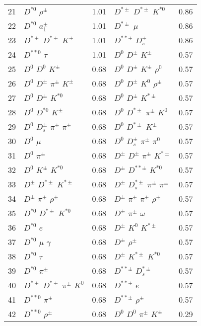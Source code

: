 \documentclass[6pt]{article}
\begin{document}
\begin{tabular}{rlr|lr}
21 & $D^{*0}$ $\rho^{\pm}$ & 1.01 & $D^{*\pm}$ $D^{*\pm}$ $K^{*0}$ & 0.86 \\
22 & $D^{*0}$ $a_1^{\pm}$ & 1.01 & $D^{*\pm}$ $\mu$ & 0.86 \\
23 & $D^{*\pm}$ $D^{*\pm}$ $K^{\pm}$ & 1.01 & $D^{**\pm}$ $D_s^{\pm}$ & 0.86 \\
24 & $D^{**0}$ $\tau$ & 1.01 & $D^0$ $D^{\pm}$ $K^{\pm}$ & 0.57 \\
25 & $D^0$ $D^0$ $K^{\pm}$ & 0.68 & $D^0$ $D^{\pm}$ $K^{\pm}$ $\rho^0$ & 0.57 \\
26 & $D^0$ $D^{\pm}$ $\pi^{\pm}$ $K^{\pm}$ & 0.68 & $D^0$ $D^{\pm}$ $K^0$ $\rho^{\pm}$ & 0.57 \\
27 & $D^0$ $D^{\pm}$ $K^{*0}$ & 0.68 & $D^0$ $D^{\pm}$ $K^{*\pm}$ & 0.57 \\
28 & $D^0$ $D^{*0}$ $K^{\pm}$ & 0.68 & $D^0$ $D^{*\pm}$ $\pi^{\pm}$ $K^0$ & 0.57 \\
29 & $D^0$ $D_s^{\pm}$ $\pi^{\pm}$ $\pi^{\pm}$ & 0.68 & $D^0$ $D^{*\pm}$ $K^{\pm}$ & 0.57 \\
30 & $D^0$ $\mu$ & 0.68 & $D^0$ $D_s^{\pm}$ $\pi^{\pm}$ $\pi^0$ & 0.57 \\
31 & $D^0$ $\pi^{\pm}$ & 0.68 & $D^{\pm}$ $D^{\pm}$ $\pi^{\pm}$ $K^{*\pm}$ & 0.57 \\
32 & $D^0$ $K^{\pm}$ $K^{*0}$ & 0.68 & $D^{\pm}$ $D^{**\pm}$ $K^{*0}$ & 0.57 \\
33 & $D^{\pm}$ $D^{*\pm}$ $K^{*\pm}$ & 0.68 & $D^{\pm}$ $D_s^{*\pm}$ $\pi^{\pm}$ $\pi^{\pm}$ & 0.57 \\
34 & $D^{\pm}$ $\pi^{\pm}$ $\rho^{\pm}$ & 0.68 & $D^{\pm}$ $\pi^{\pm}$ $\pi^{\pm}$ $\rho^{\pm}$ & 0.57 \\
35 & $D^{*0}$ $D^{*\pm}$ $K^{*0}$ & 0.68 & $D^{\pm}$ $\pi^{\pm}$ $\omega$ & 0.57 \\
36 & $D^{*0}$ $e$ & 0.68 & $D^{\pm}$ $K^0$ $K^{*\pm}$ & 0.57 \\
37 & $D^{*0}$ $\mu$ $\gamma$ & 0.68 & $D^{\pm}$ $\rho^{\pm}$ & 0.57 \\
38 & $D^{*0}$ $\tau$ & 0.68 & $D^{\pm}$ $K^{*\pm}$ $K^{*0}$ & 0.57 \\
39 & $D^{*0}$ $\pi^{\pm}$ & 0.68 & $D^{**\pm}$ $D_s^{*\pm}$ & 0.57 \\
40 & $D^{*\pm}$ $D^{*\pm}$ $\pi^{\pm}$ $K^0$ & 0.68 & $D^{**\pm}$ $e$ & 0.57 \\
41 & $D^{**0}$ $\pi^{\pm}$ & 0.68 & $D^{**\pm}$ $\rho^{\pm}$ & 0.57 \\
42 & $D^{**0}$ $\rho^{\pm}$ & 0.68 & $D^0$ $D^0$ $\pi^{\pm}$ $K^{\pm}$ & 0.29 \\

\end{tabular}
\end{document}
